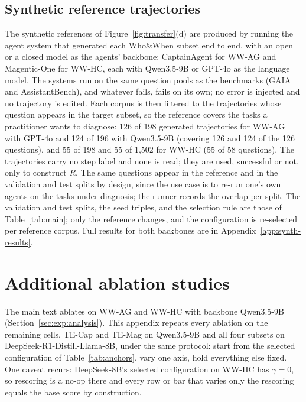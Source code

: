 \subsection{Synthetic reference trajectories}
\label{app:synth}

The synthetic references of Figure~\ref{fig:transfer}(d) are produced by running the
agent system that generated each Who\&When subset end to end, with an open or a
closed model as the agents' backbone: CaptainAgent for WW-AG and Magentic-One for
WW-HC, each with Qwen3.5-9B or GPT-4o as the language model. The systems run on the
same question pools as the benchmarks (GAIA and AssistantBench), and whatever
fails, fails on its own; no error is injected and no trajectory is edited. Each
corpus is then filtered to the trajectories whose question appears in the target
subset, so the reference covers the tasks a practitioner wants to diagnose: 126 of
198 generated trajectories for WW-AG with GPT-4o and 124 of 196 with Qwen3.5-9B
(covering 126 and 124 of the 126 questions), and 55 of 198 and 55 of 1{,}502 for
WW-HC (55 of 58 questions). The trajectories carry no step label and none is read;
they are used, successful or not, only to construct $R$. The same questions appear
in the reference and in the validation and test splits by design, since the use
case is to re-run one's own agents on the tasks under diagnosis; the runner records
the overlap per split. The validation and test splits, the seed triples, and the
selection rule are those of Table~\ref{tab:main}; only the reference changes, and
the configuration is re-selected per reference corpus. Full results for both
backbones are in Appendix~\ref{app:synth-results}.

\section{Additional ablation studies}
\label{app:deepseek-ablations}

The main text ablates \soap{} on WW-AG and WW-HC with backbone Qwen3.5-9B
(Section~\ref{sec:exp:analysis}). This appendix repeats every ablation on the
remaining cells, TE-Cap and TE-Mag on Qwen3.5-9B and all four subsets on
DeepSeek-R1-Distill-Llama-8B, under the same protocol: start from the selected
configuration of Table~\ref{tab:anchors}, vary one axis, hold everything else fixed.
One caveat recurs: DeepSeek-8B's selected configuration on WW-HC has $\gamma=0$, so
rescoring is a no-op there and every row or bar that varies only the rescoring
equals the base score by construction.

